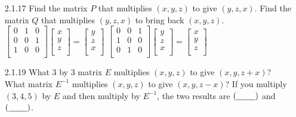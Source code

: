 \documentclass[10pt,twoside,reqno]{article}
\begin{document}
\begin{enumerate}
\item[2.1.17]Find the matrix $P$ that multiplies $(x, y, z)$ to give $(y, z, x)$. Find the matrix $Q$ that multiplies $(y, z, x)$ to bring back $(x, y, z)$. \\
\vspace{3mm}
$
$$
\begin{bmatrix}
0&1&0\\
0&0&1\\
1&0&0\\
\end{bmatrix}
\begin{bmatrix}
x\\
y\\
z\\
\end{bmatrix}
=
\begin{bmatrix}
y\\
z\\
x\\
\end{bmatrix}
$$
$
\hspace{15pt}
$
$$
\begin{bmatrix}
0&0&1\\
1&0&0\\
0&1&0\\
\end{bmatrix}
\begin{bmatrix}
y\\
z\\
x\\
\end{bmatrix}
=
\begin{bmatrix}
x\\
y\\
z\\
\end{bmatrix}
$$
$
\item[2.1.19]What 3 by 3 matrix $E$ multiplies $(x, y, z)$ to give $(x, y, z + x)$? What matrix $E^{-1}$ multiplies $(x, y, z)$ to give $(x, y, z - x)$? If you multiply $(3,4,5)$ by $E$ and then multiply by $E^{-1}$, the two results are $(\underline{\hspace{8mm}})$ and $(\underline{\hspace{8mm}})$. \\
\vspace{3mm}


\end{enumerate}
\end{document}
